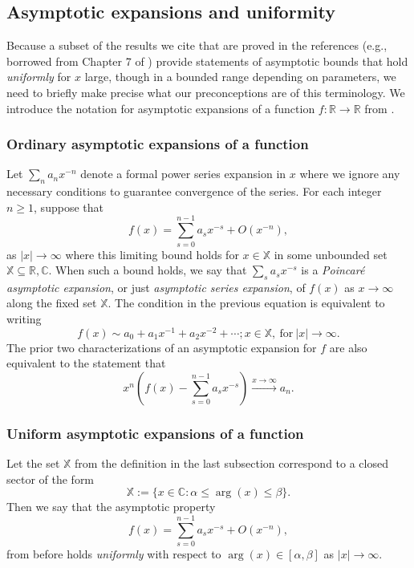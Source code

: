 \documentclass[11pt,reqno,a4letter]{article}
\numberwithin{figure}{section}
\numberwithin{table}{section}
\theoremstyle{plain}
\numberwithin{theorem}{section}
\theoremstyle{definition}
\begin{document}
\subsection{Asymptotic expansions and uniformity} 

Because a subset of the results we cite that are proved in the references 
(e.g., borrowed from Chapter 7 of \cite{MV}) provide statements of 
asymptotic bounds that hold \emph{uniformly} for $x$ large, though in a bounded range depending on parameters, 
we need to briefly make precise what our preconceptions are of this terminology. 
We introduce the notation for asymptotic expansions of a function $f: \mathbb{R} \rightarrow \mathbb{R}$ from 
\cite[\S 2.1(iii)]{NISTHB}. 

\subsubsection{Ordinary asymptotic expansions of a function} 

Let $\sum_{n} a_n x^{-n}$ denote a formal power series expansion in $x$ where we 
ignore any necessary conditions to guarantee convergence of the series. For each integer $n \geq 1$, suppose that 
\[
f(x) = \sum_{s=0}^{n-1} a_s x^{-s} + O(x^{-n}), 
\]
as $|x| \rightarrow \infty$ where this limiting bound holds for $x \in \mathbb{X}$ in some unbounded set 
$\mathbb{X} \subseteq \mathbb{R}, \mathbb{C}$. 
When such a bound holds, we say that $\sum_s a_s x^{-s}$ is a \emph{Poincar\'{e} asymptotic expansion}, 
or just \emph{asymptotic series expansion}, of $f(x)$ as $x \rightarrow \infty$ along the fixed set $\mathbb{X}$. 
The condition in the previous equation is equivalent to writing 
\[
f(x) \sim a_0 + a_1 x^{-1} + a_2 x^{-2} + \cdots; x \in \mathbb{X}, \mathrm{\ for \ } |x| \rightarrow \infty. 
\]
The prior two characterizations of an asymptotic expansion for $f$ are also equivalent to the 
statement that 
\[
x^n \left(f(x) - \sum_{s=0}^{n-1} a_s x^{-s}\right) \xrightarrow{x \rightarrow \infty} a_n. 
\] 

\subsubsection{Uniform asymptotic expansions of a function} 

Let the set $\mathbb{X}$ from the definition in the last subsection correspond to a 
closed sector of the form 
$$\mathbb{X} := \{x \in \mathbb{C}: \alpha \leq \operatorname{arg}(x) \leq \beta\}.$$ 
Then we say that the asymptotic property 
\[
f(x) = \sum_{s=0}^{n-1} a_s x^{-s} + O(x^{-n}), 
\]
from before holds \emph{uniformly} with respect to $\operatorname{arg}(x) \in [\alpha, \beta]$ as 
$|x| \rightarrow \infty$. 
\end{document}

